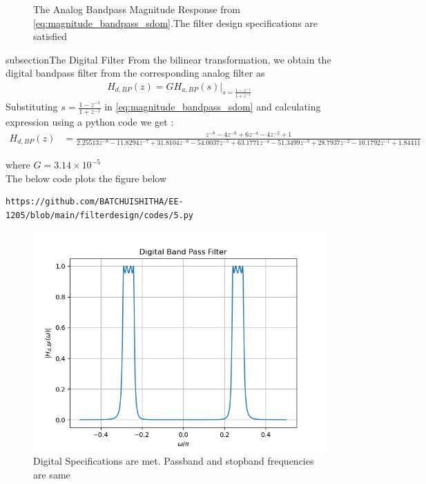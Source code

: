 \documentclass{article}
\begin{document}
\begin{enumerate}
\begin{figure}[H]
\caption{The Analog Bandpass Magnitude Response from \eqref{eq:magnitude_bandpass_sdom}.The filter design specifications are satisfied}
\label{fig:band_pass_filter}
\end{figure}

subsection{The Digital Filter}
From the bilinear transformation, we obtain the digital bandpass filter from the corresponding analog filter as
\begin{align}
    H_{d,BP}(z) = GH_{a,BP}(s)\vert_{s = \frac{1-z^{-1}}{1 + z^{-1}}}
\end{align}
Substituting $s=\frac{1-z^{-1}}{1+z^{-1}}$ in \eqref{eq:magnitude_bandpass_sdom} and calculating expression using a python code we get :
\begin{align}
    H_{d,BP}(z) &= \frac{z^{-8} - 4z^{-6} + 6z^{-4} - 4z^{-2} + 1}{2.25513z^{-8} - 11.8294z^{-7} + 31.8104z^{-6} - 54.0037z^{-5} + 63.1771z^{-4} - 51.3499z^{-3} + 28.7937z^{-2} - 10.1792z^{-1} + 1.84411}
\end{align}

where $G=3.14\times 10^{-5}$ \\
The below code plots  the figure below
\begin{lstlisting}
https://github.com/BATCHUISHITHA/EE-1205/blob/main/filterdesign/codes/5.py
\end{lstlisting}   
\begin{figure}[H]
\centering
\includegraphics[width=1\columnwidth]{figs/5.png}
\caption{Digital Specifications are met. Passband and stopband frequencies are same}
\label{fig:Digital_BPF}
\end{figure}
\end{enumerate}
\end{document}
